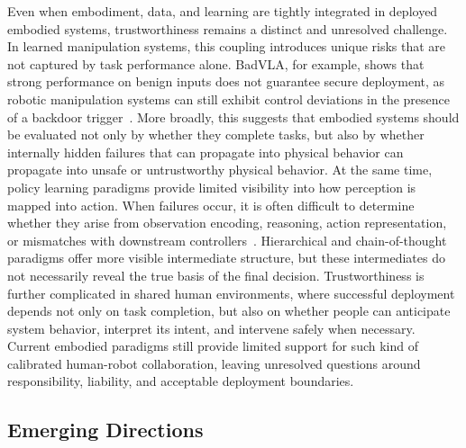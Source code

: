 \documentclass[acmsmall,screen,review]{acmart}
\begin{document}
Even when embodiment, data, and learning are tightly integrated in deployed embodied systems, trustworthiness remains a distinct and unresolved challenge. 
In learned manipulation systems, this coupling introduces unique risks that are not captured by task performance alone. 
BadVLA, for example, shows that strong performance on benign inputs does not guarantee secure deployment, as robotic manipulation systems can still exhibit control deviations in the presence of a backdoor trigger~\cite{zhou2025badvla}. 
More broadly, this suggests that embodied systems should be evaluated not only by whether they complete tasks, but also by whether internally hidden failures that can propagate into physical behavior can propagate into unsafe or untrustworthy physical behavior. 
At the same time, policy learning paradigms provide limited visibility into how perception is mapped into action. When failures occur, it is often difficult to determine whether they arise from observation encoding, reasoning, action representation, or mismatches with downstream controllers~\cite{liu2024runtime}. 
Hierarchical and chain-of-thought paradigms offer more visible intermediate structure, but these intermediates do not necessarily reveal the true basis of the final decision. 
Trustworthiness is further complicated in shared human environments, where successful deployment depends not only on task completion, but also on whether people can anticipate system behavior, interpret its intent, and intervene safely when necessary. 
Current embodied paradigms still provide limited support for such kind of calibrated human-robot collaboration, leaving unresolved questions around responsibility, liability, and acceptable deployment boundaries.

\subsection{Emerging Directions}\label{sec:future_directions}
\end{document}
